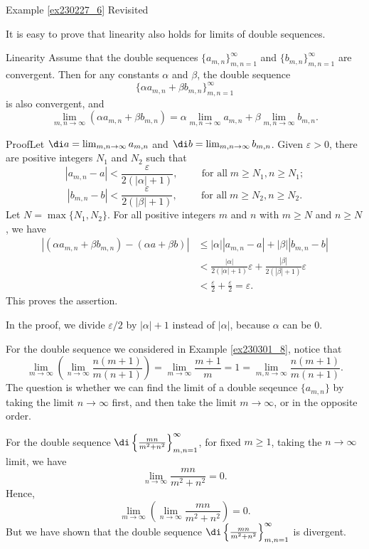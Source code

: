 \begin{example}{\linkt Example \ref{ex230227_6} Revisited}
\begin{example}[label=ex230227_13]{}
\begin{example}{}
It is easy to prove that linearity also holds for limits of double sequences.
\begin{proposition}{Linearity}
Assume that the double sequences  $\{a_{m,n}\}_{m,n=1}^{\infty}$ and  $\{b_{m,n}\}_{m,n=1}^{\infty}$ are convergent. Then for any constants $\alpha$ and $\beta$, the double sequence
 \[\{\alpha a_{m,n}+\beta b_{m,n}\}_{m,n=1}^{\infty}\] is also convergent, and
\[\lim_{m,n\to\infty}\left(\alpha a_{m,n}+\beta b_{m,n}\right)=\alpha  \lim_{m,n\to\infty}a_{m,n}+\beta \lim_{m,n\to\infty}b_{m,n}.\]
\end{proposition}
\begin{myproof}{Proof}Let $\di a=\lim_{m,n\to\infty}a_{m,n}$ and $\di b=\lim_{m,n\to\infty}b_{m,n}$. 
Given $\varepsilon>0$, there are positive integers $N_1$ and $N_2$ such that 
\[|a_{m,n}-a|<\frac{\varepsilon}{2(|\alpha|+1)},\hspace{1cm}\text{for all}\;m\geq N_1, n\geq N_1;\]
\[|b_{m,n}-b|<\frac{\varepsilon}{2(|\beta|+1)},\hspace{1cm}\text{for all}\;m\geq N_2, n\geq N_2.\]Let $N=\max\{N_1, N_2\}$. For all positive integers $m$ and $n$ with $m\geq N$ and $n\geq N$, we have
\begin{align*}
\left|\left(\alpha a_{m,n}+\beta b_{m,n}\right)-\left(\alpha a+\beta b\right)\right| &\leq |\alpha||a_{m,n}-a|+|\beta||b_{m,n}-b|\\
&<\frac{|\alpha|}{2(|\alpha|+1)}\varepsilon+\frac{|\beta|}{2(|\beta|+1)}\varepsilon\\&<\frac{\varepsilon}{2}+\frac{\varepsilon}{2}=\varepsilon.
\end{align*}
This proves the assertion.
\end{myproof}In the proof, we divide $\varepsilon/2$ by $|\alpha|+1$ instead of $|\alpha|$, because $\alpha$ can be 0.

For the double sequence we considered in Example \ref{ex230301_8}, notice that 
\[\lim_{m\to\infty}\left(\lim_{n\to\infty}\frac{n(m+1)}{m(n+1)}\right)=\lim_{m\to\infty}\frac{m+1}{m}=1=\lim_{m,n\to\infty}\frac{n(m+1)}{m(n+1)}.\]The question is whether we can find the limit of a double seqeunce $\{a_{m,n}\}$ by taking the limit $n\to\infty$ first, and then take the limit $m\to\infty$, or in the opposite order. 

For the double sequence $\di\left\{\frac{mn}{m^2+n^2}\right\}_{m,n=1}^{\infty}$, for fixed $m\geq 1$, taking the $n\to\infty$ limit, we have
\[\lim_{n\to\infty}\frac{mn}{m^2+n^2}=0.\] Hence,
\[\lim_{m\to\infty}\left(\lim_{n\to\infty}\frac{mn}{m^2+n^2}\right)=0.\]But we have shown  that the double sequence $\di\left\{\frac{mn}{m^2+n^2}\right\}_{m,n=1}^{\infty}$ is divergent.


\end{example}
\end{example}
\end{example}
